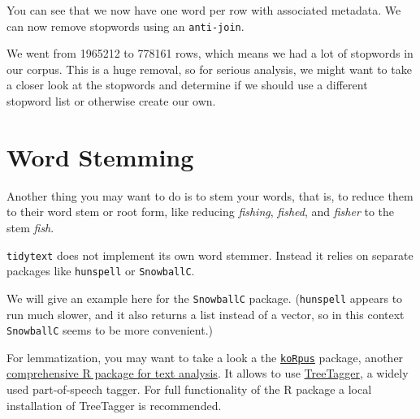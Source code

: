 \documentclass[]{book}
\newenvironment{Shaded}{\begin{snugshade}}{\end{snugshade}}
\newcommand{\DataTypeTok}[1]{\textcolor[rgb]{0.13,0.29,0.53}{#1}}
\newcommand{\KeywordTok}[1]{\textcolor[rgb]{0.13,0.29,0.53}{\textbf{#1}}}
\newcommand{\NormalTok}[1]{#1}
\newcommand{\OperatorTok}[1]{\textcolor[rgb]{0.81,0.36,0.00}{\textbf{#1}}}
\newcommand{\StringTok}[1]{\textcolor[rgb]{0.31,0.60,0.02}{#1}}
\begin{document}
You can see that we now have one word per row with associated metadata. We can now remove stopwords using an \texttt{anti-join}.

\begin{Shaded}
\end{Shaded}

We went from 1965212 to 778161 rows, which means we had a lot of stopwords in our corpus. This is a huge removal, so for serious analysis, we might want to take a closer look at the stopwords and determine if we should use a different stopword list or otherwise create our own.

\hypertarget{word-stemming}{%
\section{Word Stemming}\label{word-stemming}}

Another thing you may want to do is to stem your words, that is, to reduce them to their word stem or root form, like reducing \emph{fishing}, \emph{fished}, and \emph{fisher} to the stem \emph{fish}.

\texttt{tidytext} does not implement its own word stemmer. Instead it relies on separate packages like \texttt{hunspell} or \texttt{SnowballC}.

We will give an example here for the \texttt{SnowballC} package. (\texttt{hunspell} appears to run much slower, and it also returns a list instead of a vector, so in this context \texttt{SnowballC} seems to be more convenient.)

\begin{Shaded}
\end{Shaded}

For lemmatization, you may want to take a look a the \href{https://CRAN.R-project.org/package=koRpus}{\texttt{koRpus}} package, another \href{https://cran.r-project.org/web/packages/koRpus/vignettes/koRpus_vignette.html}{comprehensive R package for text analysis}. It allows to use \href{http://www.cis.uni-muenchen.de/~schmid/tools/TreeTagger/}{TreeTagger}, a widely used part-of-speech tagger. For full functionality of the R package a local installation of TreeTagger is recommended.
\end{document}
